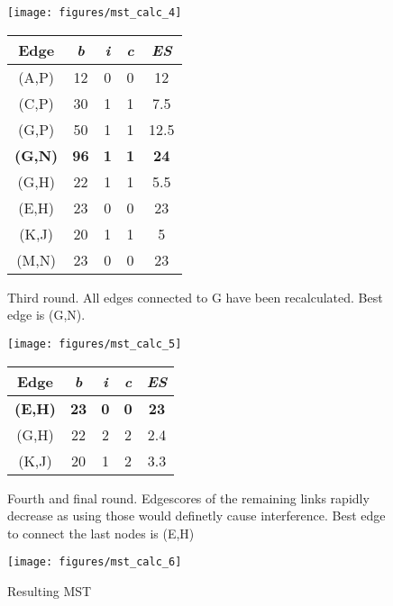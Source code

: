       \newpage
      
      \begin{figure}[h!]
	\centering
	\begin{minipage}{0.5\textwidth}
	  \texttt{[image: figures/mst\_calc\_4]}
	\end{minipage}
	\begin{minipage}{0.49\textwidth}
	  \begin{tabular}{c||c|c|c||c}
	    Edge & \textit{b} & \textit{i} & \textit{c} & \textit{ES}\\ \hline\hline
	    (A,P) & 12 & 0 & 0 & 12 \\ \hline
	    (C,P) & 30 & 1 & 1 & 7.5 \\ \hline
	    (G,P) & 50 & 1 & 1 & 12.5 \\ \hline
	    \textbf{(G,N)} & \textbf{96} & \textbf{1} & \textbf{1} & \textbf{24} \\ \hline
	    (G,H) & 22 & 1 & 1 & 5.5 \\ \hline
	    (E,H) & 23 & 0 & 0 & 23 \\ \hline
	    (K,J) & 20 & 1 & 1 & 5 \\ \hline
	    (M,N) & 23 & 0 & 0 & 23 \\ \hline
	  \end{tabular}
	\end{minipage}
	\caption{Third round. All edges connected to G have been recalculated. Best edge is (G,N).}
	\label{fig:mst_calc_4}
      \end{figure}
      
      \begin{figure}[h!]
	\centering
	\begin{minipage}{0.5\textwidth}
	  \texttt{[image: figures/mst\_calc\_5]}
	\end{minipage}
	\begin{minipage}{0.49\textwidth}
	  \begin{tabular}{c||c|c|c||c}
	    Edge & \textit{b} & \textit{i} & \textit{c} & \textit{ES}\\ \hline\hline
	    \textbf{(E,H)} & \textbf{23} & \textbf{0} & \textbf{0} & \textbf{23} \\ \hline
	    (G,H) & 22 & 2 & 2 & 2.4 \\ \hline
	    (K,J) & 20 & 1 & 2 & 3.3 \\ \hline
	  \end{tabular}
	\end{minipage}
	\caption{Fourth and final round. Edgescores of the remaining links rapidly decrease as using those would definetly cause interference. 
	  Best edge to connect the last nodes is (E,H)}
	\label{fig:mst_calc_5}
      \end{figure} 
      \begin{figure}[h!]
	\begin{minipage}{0.5\textwidth}
	  \texttt{[image: figures/mst\_calc\_6]}
	\end{minipage}
	\caption{Resulting MST}
	\label{fig:mst_calc_6}
      \end{figure}  
     \newpage
      

